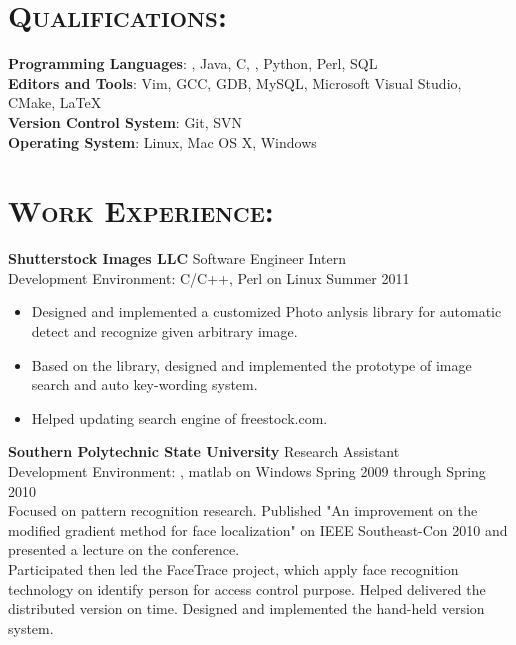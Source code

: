 \begin{resume}
\section{\textsc{Qualifications:}}

\textbf{\newline Programming Languages}: \Cplusplus, Java, C, \CSharp, Python, Perl, SQL \\
\textbf{Editors and Tools}: Vim, GCC, GDB, MySQL, Microsoft Visual Studio, CMake, \LaTeX \\
\textbf{Version Control System}: Git, SVN \\
\textbf{Operating System}: Linux, Mac OS X, Windows 


\section{\textsc{Work Experience:}}
\textbf{\newline Shutterstock Images LLC} \hfill Software Engineer Intern\\
Development Environment: C/C++, Perl on Linux \hfill Summer 2011
\begin{itemize}
    \item Designed and implemented a customized Photo anlysis library for automatic detect and recognize given arbitrary image.
    \item Based on the library, designed and implemented the prototype of image search and auto key-wording system.
    \item Helped updating search engine of freestock.com.
\end{itemize}


\textbf{Southern Polytechnic State University} \hfill Research Assistant\\
Development Environment: \CSharp, matlab on Windows \hfill Spring 2009 through Spring 2010 \\
Focused on pattern recognition research. Published "An improvement on the
modified gradient method for face localization" on IEEE Southeast-Con 2010
and presented a lecture on the conference. \\
Participated then led the FaceTrace project, which apply face recognition
technology on identify person for access control purpose.
Helped delivered the distributed version on time.
Designed and implemented the hand-held version system.


\end{resume}
